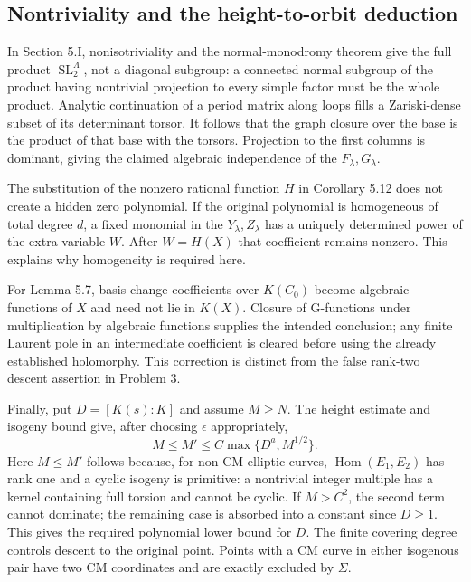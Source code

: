 \documentclass[10pt]{article}
\begin{document}
\subsection*{Nontriviality and the height-to-orbit deduction}
In Section 5.I, nonisotriviality and the normal-monodromy theorem give the full product \(\operatorname{SL}_2^\Lambda\), not a diagonal subgroup: a connected normal subgroup of the product having nontrivial projection to every simple factor must be the whole product. Analytic continuation of a period matrix along loops fills a Zariski-dense subset of its determinant torsor. It follows that the graph closure over the base is the product of that base with the torsors. Projection to the first columns is dominant, giving the claimed algebraic independence of the \(F_\lambda,G_\lambda\).\par
The substitution of the nonzero rational function \(H\) in Corollary 5.12 does not create a hidden zero polynomial. If the original polynomial is homogeneous of total degree \(d\), a fixed monomial in the \(Y_\lambda,Z_\lambda\) has a uniquely determined power of the extra variable \(W\). After \(W=H(X)\) that coefficient remains nonzero. This explains why homogeneity is required here.\par
For Lemma 5.7, basis-change coefficients over \(K(C_0)\) become algebraic functions of \(X\) and need not lie in \(K(X)\). Closure of G-functions under multiplication by algebraic functions supplies the intended conclusion; any finite Laurent pole in an intermediate coefficient is cleared before using the already established holomorphy. This correction is distinct from the false rank-two descent assertion in Problem 3.\par
Finally, put \(D=[K(s):K]\) and assume \(M\geq N\). The height estimate and isogeny bound give, after choosing \(\epsilon\) appropriately, \[M\leq M'\leq C\max\{D^a,M^{1/2}\}.\] Here \(M\leq M'\) follows because, for non-CM elliptic curves, \(\operatorname{Hom}(E_1,E_2)\) has rank one and a cyclic isogeny is primitive: a nontrivial integer multiple has a kernel containing full torsion and cannot be cyclic. If \(M>C^2\), the second term cannot dominate; the remaining case is absorbed into a constant since \(D\geq1\). This gives the required polynomial lower bound for \(D\). The finite covering degree controls descent to the original point. Points with a CM curve in either isogenous pair have two CM coordinates and are exactly excluded by \(\Sigma\).\par
\end{document}
